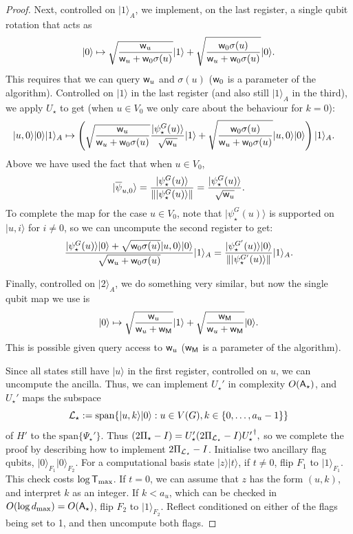 \documentclass{theoretics}
\def\ket#1{{\lvert}#1\rangle}
\renewcommand{\>}{\rangle}
\newcommand{\<}{\langle}
\renewcommand{\(}{\left(}
\renewcommand{\)}{\right)}
\def\norm#1{\left\| #1 \right\|}
\def\w{{\sf w}}
\begin{document}
\begin{proof}
\noindent Next, controlled on $\ket{1}_A$, we implement, on the last register, a single qubit rotation that acts as 
$$\ket{0}\mapsto \sqrt{\frac{\w_u}{\w_u+\w_0\sigma(u)}}\ket{1}+\sqrt{\frac{\w_0\sigma(u)}{\w_u+\w_0\sigma(u)}}\ket{0}.$$
This requires that we can query $\w_u$ and $\sigma(u)$ ($\w_0$ is a parameter of the algorithm).
Controlled on $\ket{1}$ in the last register (and also still $\ket{1}_A$ in the third), we apply $U_\star$ to get (when $u\in V_0$ we only care about the behaviour for $k=0$):
\begin{align*}
\ket{u,0}\ket{0}\ket{1}_A &\mapsto \left(\sqrt{\frac{\w_u}{\w_u+\w_0\sigma(u)}}\frac{\ket{\psi_\star^G(u)}}{\sqrt{\w_u}}\ket{1}+\sqrt{\frac{\w_0\sigma(u)}{\w_u+\w_0\sigma(u)}}\ket{u,0}\ket{0}\right)\ket{1}_A.
\end{align*}
Above we have used the fact that when $u\in V_0$,
$$\ket{\overline{\psi}_{u,0}}=\frac{\ket{\psi_{\star}^G(u)}}{\norm{\ket{\psi_{\star}^G(u)}}}=\frac{\ket{\psi_{\star}^G(u)}}{\sqrt{\w_u}}.$$
To complete the map for the case $u\in V_0$, note that $\ket{\psi_\star^G(u)}$ is supported on $\ket{u,i}$ for $i\neq 0$, so we can uncompute the second register to get:
\begin{align*}
\frac{\ket{\psi_\star^G(u)}\ket{0}+\sqrt{\w_0\sigma(u)}\ket{u,0}\ket{0}}{\sqrt{\w_u+\w_0\sigma(u)}}\ket{1}_A
=\frac{\ket{\psi_\star^{G'}(u)}\ket{0}}{\norm{\ket{\psi_\star^{G'}(u)}}}\ket{1}_A.
\end{align*}

Finally, controlled on $\ket{2}_A$, we do something very similar, but now the single qubit map we use is
$$\ket{0}\mapsto \sqrt{\frac{\w_u}{\w_u+\w_{\sf M}}}\ket{1}+\sqrt{\frac{\w_{\sf M}}{\w_u+\w_{\sf M}}}\ket{0}.$$
This is possible given query access to $\w_u$ ($\w_{\sf M}$ is a parameter of the algorithm). 

Since all states still have $\ket{u}$ in the first register, controlled on $u$, we can uncompute the ancilla. Thus, we can implement $U_\star'$ in complexity $O({\sf A}_\star)$, and $U_\star'$ maps the subspace
$${\cal L}_\star:=\mathrm{span}\{\ket{u,k}\ket{0}:u\in V(G),k\in\{0,\dots,a_u-1\}\}$$                                                                                                                                                                                        
of $H'$ to the $\mathrm{span}\{\Psi_\star'\}$. Thus
$(2\Pi_\star-I) = U_\star' (2\Pi_{{\cal L}_\star}-I) {U_\star'}^\dagger,$
so we complete the proof by describing how to implement $2\Pi_{{\cal L}_\star}-I$. Initialise two ancillary flag qubits, $\ket{0}_{F_1}\ket{0}_{F_2}$. For a computational basis state $\ket{z}\ket{t}$, if $t\neq 0$, flip $F_1$ to $\ket{1}_{F_1}$. This check costs $\log{\sf T}_{\max}$. If $t=0$, we can assume that $z$ has the form $(u,k)$, and interpret $k$ as an integer. If $k<a_u$, which can be checked in $O(\log d_{\max})=O({\sf A}_\star)$, flip $F_2$ to $\ket{1}_{F_2}$. Reflect conditioned on either of the flags being set to 1, and then uncompute both flags. 
\end{proof}
\end{document}
